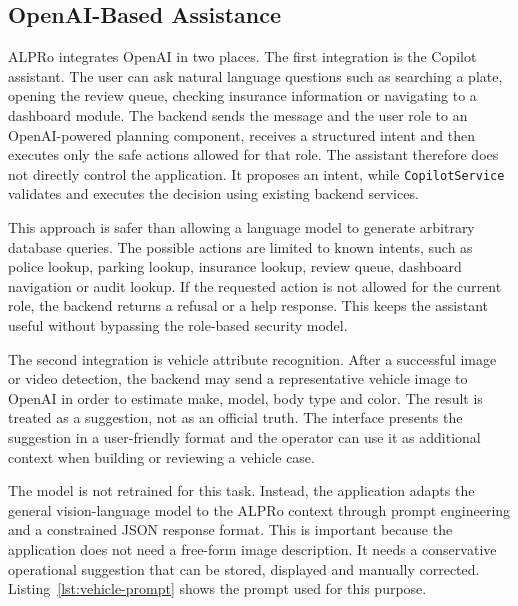 ﻿\documentclass[12pt,a4paper]{article}
\begin{document}
\subsection{OpenAI-Based Assistance}

ALPRo integrates OpenAI in two places. The first integration is the Copilot assistant. The user can ask natural language questions such as searching a plate, opening the review queue, checking insurance information or navigating to a dashboard module. The backend sends the message and the user role to an OpenAI-powered planning component, receives a structured intent and then executes only the safe actions allowed for that role. The assistant therefore does not directly control the application. It proposes an intent, while \texttt{CopilotService} validates and executes the decision using existing backend services.

This approach is safer than allowing a language model to generate arbitrary database queries. The possible actions are limited to known intents, such as police lookup, parking lookup, insurance lookup, review queue, dashboard navigation or audit lookup. If the requested action is not allowed for the current role, the backend returns a refusal or a help response. This keeps the assistant useful without bypassing the role-based security model.

The second integration is vehicle attribute recognition. After a successful image or video detection, the backend may send a representative vehicle image to OpenAI in order to estimate make, model, body type and color. The result is treated as a suggestion, not as an official truth. The interface presents the suggestion in a user-friendly format and the operator can use it as additional context when building or reviewing a vehicle case.

The model is not retrained for this task. Instead, the application adapts the general vision-language model to the ALPRo context through prompt engineering and a constrained JSON response format. This is important because the application does not need a free-form image description. It needs a conservative operational suggestion that can be stored, displayed and manually corrected. Listing~\ref{lst:vehicle-prompt} shows the prompt used for this purpose.
\end{document}
